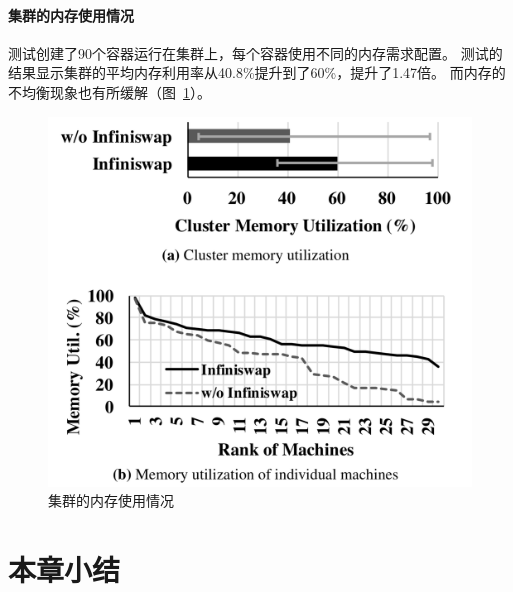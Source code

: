 \paragraph{集群的内存使用情况}
测试创建了90个容器运行在集群上，每个容器使用不同的内存需求配置。
测试的结果显示集群的平均内存利用率从40.8\%提升到了60\%，提升了1.47倍。
而内存的不均衡现象也有所缓解（图~\ref{fig:infiniswap_evaluation2}）。

\begin{figure}
\centering
\includegraphics[scale=0.3]{Figures/memory/infiniswap_evaluation2.png}
\decoRule
\caption{集群的内存使用情况}
\label{fig:infiniswap_evaluation2}
\end{figure}



\section{本章小结}
